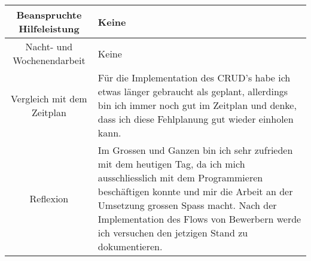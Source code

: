 \begin{tabularx}{\textwidth}[H]{|c|X|}
    Beanspruchte Hilfeleistung &
    Keine
    \\ \hline

    Nacht- und Wochenendarbeit &
    Keine
    \\ \hline

    Vergleich mit dem Zeitplan &
    Für die Implementation des CRUD's habe ich etwas länger gebraucht als geplant, allerdings
    bin ich immer noch gut im Zeitplan und denke, dass ich diese Fehlplanung gut wieder einholen kann.
    \\ \hline

    Reflexion                  &
    Im Grossen und Ganzen bin ich sehr zufrieden mit dem heutigen Tag, da ich mich ausschliesslich
    mit dem Programmieren beschäftigen konnte und mir die Arbeit an der Umsetzung grossen Spass macht.
    Nach der Implementation des Flows von Bewerbern werde ich versuchen den jetzigen Stand zu dokumentieren.
    \\ \hline
\end{tabularx}

